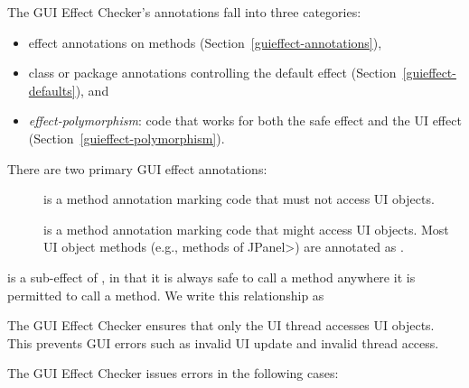 
The GUI Effect Checker's annotations fall into three categories:

\begin{itemize}
\item
  effect annotations on methods (Section~\ref{guieffect-annotations}),
\item
 class or package annotations controlling the default effect (Section~\ref{guieffect-defaults}), and
\item
  \emph{effect-polymorphism}:  code that works for both the safe effect and
  the UI effect (Section~\ref{guieffect-polymorphism}).
\end{itemize}



There are two primary GUI effect annotations:
\begin{description}
\item[]
  is a method annotation marking code that must not
  access UI objects.
\item[]
  is a method annotation marking code that might access
  UI objects.  Most UI object methods (e.g., methods of \<JPanel>) are
  annotated as .
\end{description}

 is a sub-effect of , in that it is always safe to
call a  method anywhere it is permitted to call a
 method.  We write this relationship as

\centerline{ \precsym{} }



The GUI Effect Checker ensures that only the UI thread accesses UI objects.
This prevents GUI errors such
as invalid UI update and invalid thread access.

The GUI Effect Checker issues errors in the following cases:


